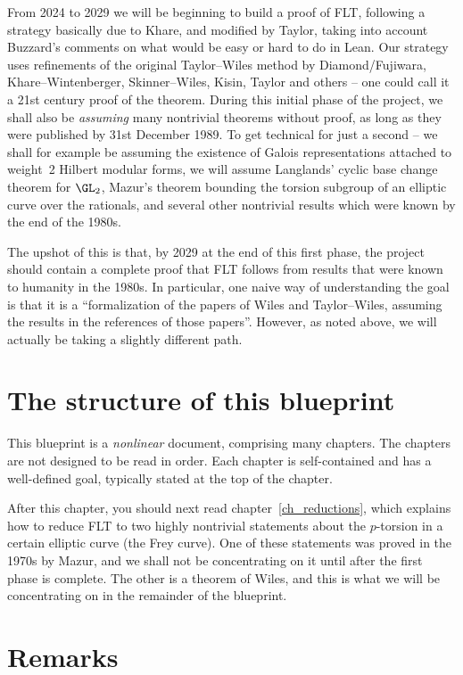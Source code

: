 From 2024 to 2029 we will be beginning to build a proof of FLT, following a strategy
basically due to Khare, and modified by Taylor, taking into account Buzzard's comments on what
would be easy or hard to do
in Lean. Our strategy uses refinements of the original Taylor--Wiles method by Diamond/Fujiwara,
Khare--Wintenberger, Skinner--Wiles, Kisin, Taylor and others -- one could call it a 21st century
proof of the theorem. During this initial phase of the project, we shall also be \emph{assuming}
many nontrivial theorems without proof, as long as they were published by 31st December 1989.
To get technical for just a second -- we shall for example be assuming the existence of Galois
representations attached to weight~2 Hilbert modular forms, we will assume Langlands' cyclic base
change theorem for $\GL_2$, Mazur's theorem bounding the torsion subgroup of an elliptic curve over
the rationals, and several other nontrivial results which were known by the end of the 1980s.

The upshot of this is that, by 2029 at the end of this first phase, the project should contain a
complete proof that FLT follows from results that were known to humanity in the 1980s. In
particular, one naive way of understanding the goal is that it is a ``formalization of the papers
of Wiles and Taylor--Wiles, assuming the results in the references of those papers''. However,
as noted above, we will actually be taking a slightly different path.

\section{The structure of this blueprint}

This blueprint is a \emph{nonlinear} document, comprising many chapters. The chapters
are not designed to be read in order. Each chapter is self-contained and has a well-defined goal,
typically stated at the top of the chapter.

After this chapter, you should next read chapter~\ref{ch_reductions}, which explains how to reduce FLT
to two highly nontrivial statements about the $p$-torsion in a certain elliptic curve (the Frey curve).
One of these statements was proved in the 1970s by Mazur, and we shall not be concentrating on
it until after the first phase is complete. The other is a theorem of Wiles, and this is what we will
be concentrating on in the remainder of the blueprint.

\section{Remarks}

